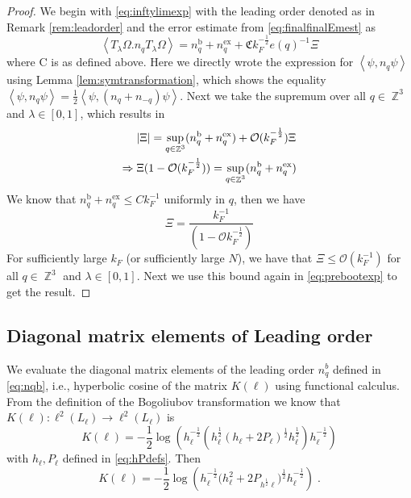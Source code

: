 \documentclass[sn-mathphys, Numbered ,a4paper]{sn-jnl}%
\DeclareMathOperator{\Z}{\mathbb{Z}}
\newcommand{\half}{\frac{1}{2}}
\newcommand{\eva}[1]{\left\langle #1 \right\rangle}
\theoremstyle{plain}
\theoremstyle{definition}
\theoremstyle{remark}
\theoremstyle{plain}
\theoremstyle{definition}
\theoremstyle{remark}
\begin{document}
\begin{proof}
	We begin with \eqref{eq:inftylimexp} with the leading order denoted as in Remark \ref{rem:leadorder} and the error estimate from \eqref{eq:finalfinalEmest} as
	\begin{equation}\label{eq:prebootexp}
		\eva{ T_{\lambda}\Omega. n_q T_{\lambda}\Omega} = n_q^\mathrm{b} + n_q^\mathrm{ex} + \mathfrak{C} k_F^{-\frac{1}{2}}e(q)^{-1}\Xi
\end{equation}
where C is as defined above. Here we directly wrote the expression for $\eva{\psi,n_q\psi}$ using Lemma \ref{lem:symtransformation}, which shows the equality $\eva{\psi,n_q\psi} = \half \eva{\psi,(n_q + n_{-q})\psi}$. Next we take the supremum over all $q \in \Z^3$ and $\lambda \in [0,1]$, which results in
\begin{align}
	&\abs{\Xi} = \sup_{q \in \Z^3}(n_q^\mathrm{b} + n_{q}^\mathrm{ex}) +\mathcal{O}(k_F^{-\frac{1}{2}})\Xi \nonumber\\
	\Rightarrow\; &\Xi(1 - \mathcal{O}(k_F^{-\frac{1}{2}})) = \sup_{q \in \Z^3}(n_q^\mathrm{b} + n_{q}^\mathrm{ex})
\end{align}
We know that $n_q^{\mathrm{b}}+n_q^{\mathrm{ex}} \leq Ck_F^{-1}$ uniformly in $q$, then we have 
\begin{equation}
	\Xi = \frac{k_F^{-1}}{(1 - \mathcal{O}k_F^{-\frac{1}{2}})}
\end{equation}
For sufficiently large $k_F$ (or sufficiently large $N$), we have that $\Xi\leq \mathcal{O}(k_F^{-1})$ for all $q \in \Z^3$ and $\lambda \in [0,1]$. Next we use this bound again in \eqref{eq:prebootexp} to get the result.
\end{proof}

\subsection{Diagonal matrix elements of Leading order}
We evaluate the diagonal matrix elements of the leading order $n_q^b$ defined in \eqref{eq:nqb}, i.e., hyperbolic cosine of the matrix $K(\ell)$ using functional calculus.
From the definition of the Bogoliubov transformation we know that $K(\ell): \ell^2(L_{\ell})\rightarrow \ell^2(L_{\ell})$ is
\begin{equation}
	K(\ell) = -\half\log(h^{-\half}_{\ell}(h^{\half}_{\ell}(h_{\ell}+2P_\ell)^{\half}h^{\half}_{\ell})h^{-\half}_{\ell})
\end{equation}
with $h_\ell, P_{\ell}$ defined in \eqref{eq:hPdefs}. Then
\begin{equation}
	K(\ell) = -\half\log\left(h^{-\half}_{\ell}\big(h^2_{\ell}+2P_{h^{\half}\ell}\big)^{\half}h^{-\half}_{\ell}\right)\;.
\end{equation}
\end{document}
